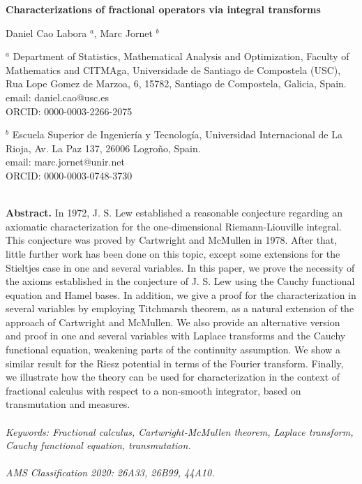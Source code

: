 \documentclass[12pt,reqno]{amsart}
\theoremstyle{plain}
\numberwithin{equation}{section} %
\begin{document}
\begin{center}
 \textbf{Characterizations of fractional operators via integral transforms}
\end{center}

\begin{center}
 Daniel Cao Labora $^a$, Marc Jornet $^b$
\end{center}

\begin{center}
$^a$ Department of Statistics, Mathematical Analysis and Optimization, Faculty of Mathematics and CITMAga, Universidade de Santiago de Compostela (USC), Rua Lope Gomez de Marzoa, 6, 15782, Santiago de Compostela, Galicia, Spain. \\
email: daniel.cao@usc.es \\ 
ORCID: 0000-0003-2266-2075
\end{center}

\begin{center}
$^b$ Escuela Superior de Ingenier\'ia y Tecnolog\'ia, Universidad Internacional de La Rioja, Av. La Paz 137, 26006 Logro\~no, Spain. \\
email: marc.jornet@unir.net \\ 
ORCID: 0000-0003-0748-3730
\end{center}

\ \\
\textbf{Abstract.} In 1972, J. S. Lew established a reasonable conjecture regarding an axiomatic characterization for the one-dimensional Riemann-Liouville integral. This conjecture was proved by Cartwright and McMullen in 1978. After that, little further work has been done on this topic, except some extensions for the Stieltjes case in one and several variables. In this paper, we prove the necessity of the axioms established in the conjecture of J. S. Lew using the Cauchy functional equation and Hamel bases. In addition, we give a proof for the characterization in several variables by employing Titchmarsh theorem, as a natural extension of the approach of Cartwright and McMullen. We also provide an alternative version and proof in one and several variables with Laplace transforms and the Cauchy functional equation, weakening parts of the continuity assumption. We show a similar result for the Riesz potential in terms of the Fourier transform. Finally, we illustrate how the theory can be used for characterization in the context of fractional calculus with respect to a non-smooth integrator, based on transmutation and measures. \\
\\
\textit{Keywords: Fractional calculus, Cartwright-McMullen theorem, Laplace transform, Cauchy functional equation, transmutation.} \\
\\
\textit{AMS Classification 2020: 26A33, 26B99, 44A10.}
\end{document}
